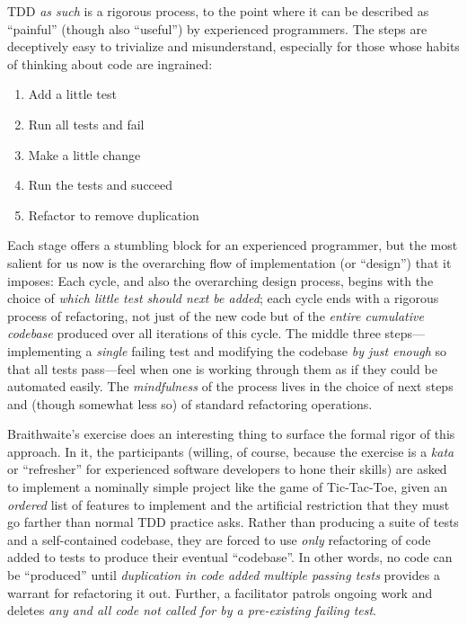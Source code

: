 TDD \emph{as such} is a rigorous process, to the point where it can be described as ``painful'' (though also ``useful'') by experienced programmers. The steps are deceptively easy to trivialize and misunderstand, especially for those whose habits of thinking about code are ingrained:

\begin{enumerate}
\item Add a little test
\item Run all tests and fail
\item Make a little change
\item Run the tests and succeed
\item Refactor to remove duplication
\end{enumerate}

Each stage offers a stumbling block for an experienced programmer, but the most salient for us now is the overarching flow of implementation (or ``design'') that it imposes: Each cycle, and also the overarching design process, begins with the choice of \emph{which little test should next be added}; each cycle ends with a rigorous process of refactoring, not just of the new code but of the \emph{entire cumulative codebase} produced over all iterations of this cycle. The middle three steps---implementing a \emph{single} failing test and modifying the codebase \emph{by just enough} so that all tests pass---feel when one is working through them as if they could be automated easily. The \emph{mindfulness} of the process lives in the choice of next steps and (though somewhat less so) of standard refactoring operations.

Braithwaite's exercise does an interesting thing to surface the formal rigor of this approach. In it, the participants (willing, of course, because the exercise is a \emph{kata} or ``refresher'' for experienced software developers to hone their skills) are asked to implement a nominally simple project like the game of Tic-Tac-Toe, given an \emph{ordered} list of features to implement and the artificial restriction that they must go farther than normal TDD practice asks. Rather than producing a suite of tests and a self-contained codebase, they are forced to use \emph{only} refactoring of code added to tests to produce their eventual ``codebase''. In other words, no code can be ``produced'' until \emph{duplication in code added multiple passing tests} provides a warrant for refactoring it out. Further, a facilitator patrols ongoing work and deletes \emph{any and all code not called for by a pre-existing failing test}.

